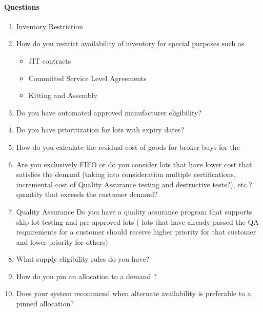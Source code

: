 \documentclass[letterpaper,10pt,english]{sphinxmanual}
\begin{document}
\paragraph{Questions}
\label{\detokenize{FutureState:id2}}\begin{enumerate}
%
\item {} 
Inventory Restriction

\item {} 
How do you restrict availability of inventory for special purposes
such as
\begin{itemize}
\item {} 
JIT contracts

\item {} 
Committed Service Level Agreements

\item {} 
Kitting and Assembly

\end{itemize}

\item {} 
Do you have automated approved manufacturer eligibility?

\item {} 
Do you have prioritization for lots with expiry dates?

\item {} 
How do you calculate the residual cost of goods for broker buys for
the

\item {} 
Are you exclusively FIFO or do you consider lots that have lower cost
that satisfies the demand (taking into consideration multiple
certifications, incremental cost of Quality Assurance testing and
destructive tests?), etc.? quantity that exceeds the customer demand?

\item {} 
Quality Assurance Do you have a quality assurance program that
supports skip lot testing and pre-approved lots ( lots that have
already passed the QA requirements for a customer should receive
higher priority for that customer and lower priority for others)

\item {} 
What supply eligibility rules do you have?

\item {} 
How do you pin an allocation to a demand ?

\item {} 
Does your system recommend when alternate availability is preferable
to a pinned allocation?

\end{enumerate}



\renewcommand{\indexname}{Index}
\printindex
\end{document}
